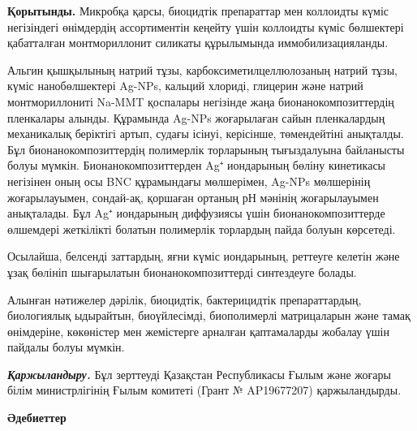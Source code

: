 {\bfseries Қорытынды.} Микробқа қарсы, биоцидтік препараттар мен коллоидты
күміс негізіндегі өнімдердің ассортиментін кеңейту үшін коллоидты күміс
бөлшектері қабатталған монтмориллонит силикаты құрылымында
иммобилизацияланды.

Альгин қышқылының натрий тұзы, карбоксиметилцеллюлозаның натрий тұзы,
күміс нанобөлшектері Ag-NPs, кальций хлориді, глицерин және натрий
монтмориллониті Na-MMT қоспалары негізінде жаңа бионанокомпозиттердің
пленкалары алынды. Құрамында Ag-NPs жоғарылаған сайын пленкалардың
механикалық беріктігі артып, судағы ісінуі, керісінше, төмендейтіні
анықталды. Бұл бионанокомпозиттердің полимерлік торларының тығыздалуына
байланысты болуы мүмкін. Бионанокомпозиттерден Ag⁺ иондарының бөліну
кинетикасы негізінен оның осы BNC құрамындағы мөлшерімен, Ag-NPs
мөлшерінің жоғарылауымен, сондай-ақ, қоршаған ортаның рН мәнінің
жоғарылауымен анықталады. Бұл Ag⁺ иондарының диффузиясы үшін
бионанокомпозиттерде өлшемдері жеткілікті болатын полимерлік торлардың
пайда болуын көрсетеді.

Осылайша, белсенді заттардың, яғни күміс иондарының, реттеуге келетін
және ұзақ бөлініп шығарылатын бионанокомпозиттерді синтездеуге болады.

Алынған нәтижелер дәрілік, биоцидтік, бактерицидтік препараттардың,
биологиялық ыдырайтын, биоүйлесімді, биополимерлі матрицаларын және
тамақ өнімдеріне, көкөністер мен жемістерге арналған қаптамаларды
жобалау үшін пайдалы болуы мүмкін.

\emph{{\bfseries Қаржыландыру.}} Бұл зерттеуді Қазақстан Республикасы Ғылым
және жоғары білім министрлігінің Ғылым комитеті (Грант № AP19677207)
қаржыландырды.

{\bfseries Әдебиеттер}

